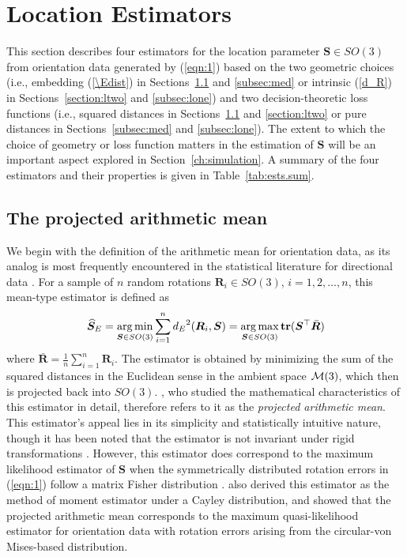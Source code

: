 \section{Location Estimators}\label{sec:estimators}
This section describes four estimators for   the location parameter $\bm{S}\in SO(3)$ from orientation data generated by (\ref{eqn:1})
based on the two geometric choices (i.e., embedding (\ref{\Edist})  in Sections~\ref{subsec:pam} and \ref{subsec:med} or intrinsic (\ref{d_R}) in Sections~\ref{section:ltwo}
and \ref{subsec:lone})
and two decision-theoretic loss functions (i.e., squared distances in Sections~\ref{subsec:pam} and \ref{section:ltwo} or pure distances in Sections~\ref{subsec:med} and \ref{subsec:lone}).    The extent to which the choice of geometry or loss function matters in the estimation of $\bm{S}$ will be an important
aspect explored in Section~\ref{ch:simulation}.  A summary of the four estimators and their properties is given in Table~\ref{tab:ests.sum}.



\subsection{The projected arithmetic mean}
\label{subsec:pam}

We begin with the definition of the arithmetic mean for orientation data, as its analog is most frequently encountered in the statistical literature for directional data \citep[e.g. see][]{mardia00}.   For a sample of $n$ random rotations $\bm{R}_i\in SO(3)$, $i=1,2,\dots,n$, this mean-type estimator is defined as
\begin{equation}\label{est:pam}
{\widehat{\bm S}_E}=\operatorname*{arg\,min}_{\bm{S}\in
SO(3)}\sum_{i=1}^n{d_E}^2(\bm{R}_i,\bm{S})=\operatorname*{arg\,max}_{\bm{S}\in
SO(3)}{\mathbf{tr}}(\bm{S}^{\top}\bar{\bm{R}})
\end{equation}
where $\bar{\bm{R}}=\frac{1}{n}\sum_{i=1}^n\bm{R}_i$. The estimator is obtained by minimizing the sum of the squared distances in the Euclidean
sense in the ambient space $\mathcal{M}(3)$, which then is projected back into $SO(3)$. \citet{moakher02}, who studied the mathematical characteristics of this estimator in detail, therefore refers to it as the \textit{projected arithmetic mean}.    This estimator's appeal lies in its simplicity and statistically intuitive nature, though it has been noted that the estimator is not invariant under rigid transformations \citep[see][]{moakher02}.  
However, this estimator does correspond to the maximum likelihood estimator of $\bm{S}$ when the symmetrically distributed rotation errors
in (\ref{eqn:1}) follow a matrix Fisher distribution \citep{jupp79}.  \citet{leon06} also derived this estimator as the method of moment estimator under a Cayley  distribution, and 
 \citet{bingham09} showed that the projected arithmetic mean corresponds to the maximum quasi-likelihood estimator for orientation data with rotation errors arising from the circular-von Mises-based distribution.  

